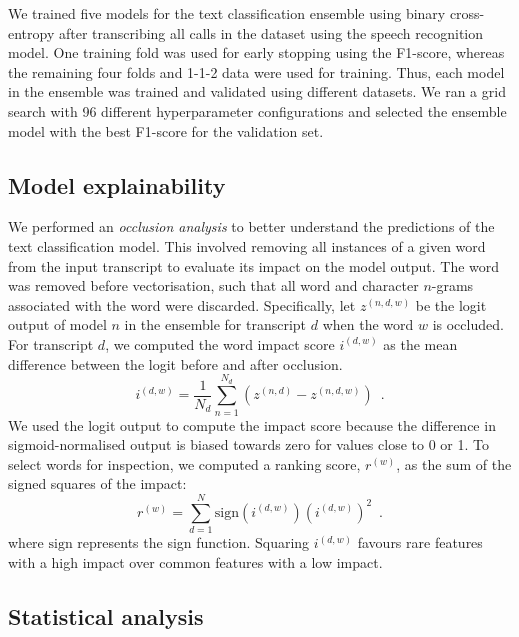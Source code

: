 {We trained five models for the text classification ensemble using binary cross-entropy after transcribing all calls in the dataset using the speech recognition model. One training fold was used for early stopping using the F1-score, whereas the remaining four folds and 1-1-2 data were used for training. Thus, each model in the ensemble was trained and validated using different datasets. We ran a grid search with 96 different hyperparameter configurations and selected the ensemble model with the best F1-score for the validation set. 


\subsection{Model explainability}\label{sec_retrospective:model_explainability}

We performed an \emph{occlusion analysis} to better understand the predictions of the text classification model. This involved removing all instances of a given word from the input transcript to evaluate its impact on the model output. The word was removed before vectorisation, such that all word and character $n$-grams associated with the word were discarded. Specifically, let $z^{(n, d, w)}$ be the logit output of model $n$ in the ensemble for transcript $d$ when the word $w$ is occluded. For transcript $d$, we computed the word impact score $i^{(d, w)}$ as the mean difference between the logit before and after occlusion.
%
\begin{equation}
    i^{(d,w)} = \frac{1}{N_d} \sum_{n=1}^{N_d} \left( z^{(n, d)} - z^{(n, d, w)} \right) \enspace .
\end{equation}
%
We used the logit output to compute the impact score because the difference in sigmoid-normalised output is biased towards zero for values close to 0 or 1. To select words for inspection, we computed a ranking score, $r^{(w)}$, as the sum of the signed squares of the impact:
%
\begin{equation}
    r^{(w)} = \sum_{d=1}^{N} \text{sign}\left( i^{(d, w)} \right) \left( i^{(d,w)}\right) ^2 \enspace .
\end{equation}
%
where $\text{sign}$ represents the sign function. Squaring $i^{(d,w)}$ favours rare features with a high impact over common features with a low impact.


\subsection{Statistical analysis}

}
